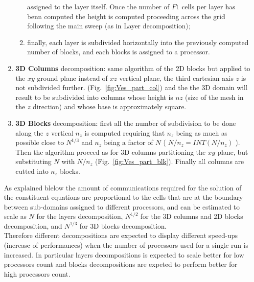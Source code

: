 \begin{enumerate}
\begin{enumerate}
assigned to the layer itself. 
Once the number of $F1$ cells per layer has benn computed the height is computed 
proceeding across the grid following the main sweep (as in Layer decomposition);
\item finally, each layer is subdivided horizontally into the previously computed number
of blocks, and each blocks is assigned to a processor. 
\end{enumerate}
\item {\bf 3D Columns } decomposition: same algorithm of the 2D blocks but applied to the $xy$ 
ground plane instead of $xz$ vertical plane, the third cartesian axis $z$ is not subdivided
further. (Fig.~\ref{fig:Ves_part_col}) and the the 3D domain will result to be subdivided
into columns whose height is $nz$ (size of the mesh in the $z$ direction) and whose base
is approximately square.
\item {\bf 3D Blocks} decomposition: first all the number of subdivision to be done
along the $z$ vertical $n_z$ is computed requiring that $n_z$ being as much as possible
close to $N^{1/3}$ and $n_z$ being a factor of $N$ ( $N/n_z = INT(N/n_z)$ ).
Then the algorithm proceed as for 3D columns partitioning the $xy$ plane, 
but substituting $N$ with $N/n_z$ (Fig.~\ref{fig:Ves_part_blk}). 
Finally all columns are cutted into $n_z$ blocks.
\end{enumerate}

As explained blelow the amount of communications required for the solution 
of the constituent equations
are proportional to the cells that are at the boundary between sub-domains assigned to
different processors, and can be estimated to scale as $N$ for the layers decomposition, 
$N^{1/2}$ for the 3D columns
and 2D blocks decomposition, and $N^{1/3}$ for 3D blocks decomposition.\\
Therefore different decompositions are expected to display different speed-ups
(increase of performances) when the number of processors used for a single run
is increased. In particular layers decompositions is expected to scale better
for low processors count and blocks decompositions are expeted to perform 
better for high processors count.

